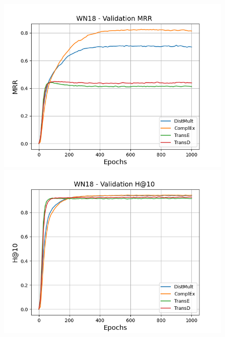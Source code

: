 \begin{figure}
    \centering
    \begin{minipage}{.3\textwidth}
      \centering
      \includegraphics[width=\linewidth]{figures/results/pretrain/wn18/pretrain_wn18_mrrs.png}
    \end{minipage}%
    \begin{minipage}{.3\textwidth}
      \centering
      \includegraphics[width=\linewidth]{figures/results/pretrain/wn18/pretrain_wn18_hit10.png}
    \end{minipage}
    \begin{minipage}{.3\textwidth}
      \centering

\end{minipage}
\end{figure}
